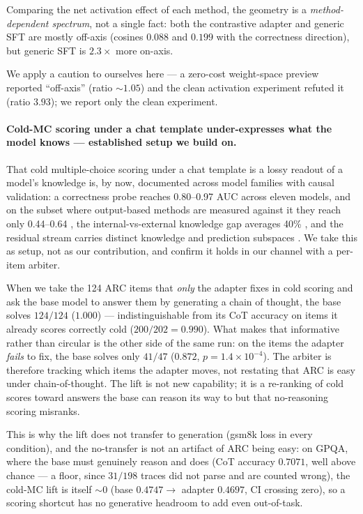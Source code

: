 Comparing the net activation effect of each method, the geometry is a
\emph{method-dependent spectrum}, not a single fact: both the contrastive adapter
and generic SFT are mostly off-axis (cosines $0.088$ and $0.199$ with the
correctness direction), but generic SFT is $2.3\times$ more on-axis.

We apply a caution to ourselves here --- a zero-cost weight-space preview reported
``off-axis'' (ratio ${\sim}1.05$) and the clean activation experiment refuted it
(ratio $3.93$); we report only the clean experiment.

\paragraph{Cold-MC scoring under a chat template under-expresses what the model
knows --- established setup we build on.}
That cold multiple-choice scoring under a chat template is a lossy readout of a
model's knowledge is, by now, documented across model families with causal
validation: a correctness probe reaches 0.80--0.97 AUC across eleven models, and on
the subset where output-based methods are measured against it they reach only
0.44--0.64 \citep{ConfidenceManifold}, the internal-vs-external
knowledge gap averages 40\% \citep{InsideOut}, and the residual stream carries
distinct knowledge and prediction subspaces \citep{KAPPA}. We take this as setup,
not as our contribution, and confirm it holds in our channel with a per-item
arbiter.

When we take the 124 ARC items that \emph{only} the adapter fixes in cold scoring
and ask the base model to answer them by generating a chain of thought, the base
solves $124/124$ ($1.000$) --- indistinguishable from its CoT accuracy on items it
already scores correctly cold ($200/202 = 0.990$). What makes that informative
rather than circular is the other side of the same run: on the items the adapter
\emph{fails} to fix, the base solves only $41/47$ ($0.872$, $p=1.4\times10^{-4}$).
The arbiter is therefore tracking which items the adapter moves, not restating that
ARC is easy under chain-of-thought. The lift is not new capability; it is a
re-ranking of cold scores toward answers the base can reason its way to but that
no-reasoning scoring misranks.

This is why the lift does not transfer to generation (gsm8k loss in every
condition), and the no-transfer is not an artifact of ARC being easy: on GPQA, where
the base must genuinely reason and does (CoT accuracy $0.7071$, well above chance ---
a floor, since $31/198$ traces did not parse and are counted wrong),
the cold-MC lift is itself ${\sim}0$ (base $0.4747 \rightarrow$ adapter $0.4697$,
CI crossing zero), so a scoring shortcut has no generative headroom to add even
out-of-task.

